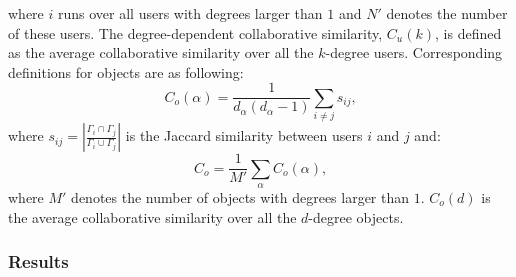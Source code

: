       where $i$ runs over all users with degrees larger than $1$ and $N\prime$ denotes the number of these users. The degree-dependent collaborative similarity, $C_u(k)$, is defined as the average collaborative similarity over all the $k$-degree users. Corresponding definitions for objects are as following:
      \begin{equation}
        C_o(\alpha) = \frac{1}{d_\alpha(d_\alpha-1)} \sum_{i\neq j} s_{ij}\mbox{,}
      \end{equation}
      where $s_{ij} = \left| \frac{\Gamma_i \cap \Gamma_j}{\Gamma_i \cup \Gamma_j} \right|$ is the Jaccard similarity between users $i$ and $j$ and:
      \begin{equation}
        C_o = \frac{1}{M\prime} \sum_\alpha C_o(\alpha)\mbox{,}
      \end{equation}
      where $M\prime$ denotes the number of objects with degrees larger than $1$. $C_o(d)$ is the average collaborative similarity over all the $d$-degree objects.

    \subsubsection{Results}
    
